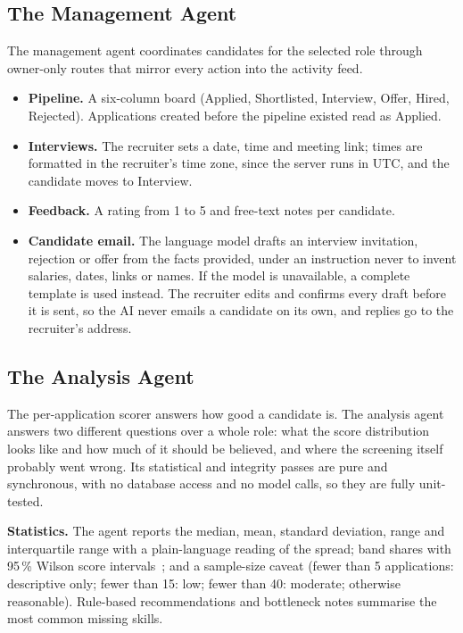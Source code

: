 \documentclass[conference]{IEEEtran}
\begin{document}
\subsection{The Management Agent}

The management agent coordinates candidates for the selected role through
owner-only routes that mirror every action into the activity feed.

\begin{itemize}
\item \textbf{Pipeline.} A six-column board (Applied, Shortlisted, Interview,
Offer, Hired, Rejected). Applications created before the pipeline existed read
as Applied.
\item \textbf{Interviews.} The recruiter sets a date, time and meeting link;
times are formatted in the recruiter's time zone, since the server runs in UTC,
and the candidate moves to Interview.
\item \textbf{Feedback.} A rating from 1 to 5 and free-text notes per candidate.
\item \textbf{Candidate email.} The language model drafts an interview
invitation, rejection or offer from the facts provided, under an instruction
never to invent salaries, dates, links or names. If the model is unavailable, a
complete template is used instead. The recruiter edits and confirms every draft
before it is sent, so the AI never emails a candidate on its own, and replies go
to the recruiter's address.
\end{itemize}

\subsection{The Analysis Agent}
\label{sec:analysis}

The per-application scorer answers how good a candidate is. The analysis agent
answers two different questions over a whole role: what the score distribution
looks like and how much of it should be believed, and where the screening itself
probably went wrong. Its statistical and integrity passes are pure and
synchronous, with no database access and no model calls, so they are fully
unit-tested.

\textbf{Statistics.} The agent reports the median, mean, standard deviation,
range and interquartile range with a plain-language reading of the spread; band
shares with 95\,\% Wilson score intervals~\cite{b25}; and a sample-size caveat
(fewer than 5 applications: descriptive only; fewer than 15: low; fewer than 40:
moderate; otherwise reasonable). Rule-based recommendations and bottleneck notes
summarise the most common missing skills.
\end{document}
